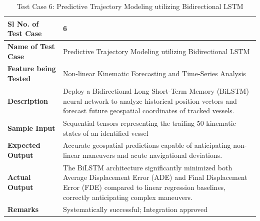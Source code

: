 \begin{table}[H]
\centering
\caption{Test Case 6: Predictive Trajectory Modeling utilizing Bidirectional LSTM}
\label{tab:testcase6}
\begin{tabular}{|p{}|p{}|}
\hline
\textbf{Sl No. of Test Case} & 6 \\
\hline
\textbf{Name of Test Case} & Predictive Trajectory Modeling utilizing Bidirectional LSTM \\
\hline
\textbf{Feature being Tested} & Non-linear Kinematic Forecasting and Time-Series Analysis \\
\hline
\textbf{Description} & Deploy a Bidirectional Long Short-Term Memory (BiLSTM) neural network to analyze historical position vectors and forecast future geospatial coordinates of tracked vessels. \\
\hline
\textbf{Sample Input} & Sequential tensors representing the trailing 50 kinematic states of an identified vessel \\
\hline
\textbf{Expected Output} & Accurate geospatial predictions capable of anticipating non-linear maneuvers and acute navigational deviations. \\
\hline
\textbf{Actual Output} & The BiLSTM architecture significantly minimized both Average Displacement Error (ADE) and Final Displacement Error (FDE) compared to linear regression baselines, correctly anticipating complex maneuvers. \\
\hline
\textbf{Remarks} & Systematically successful; Integration approved \\
\hline
\end{tabular}
\end{table}

